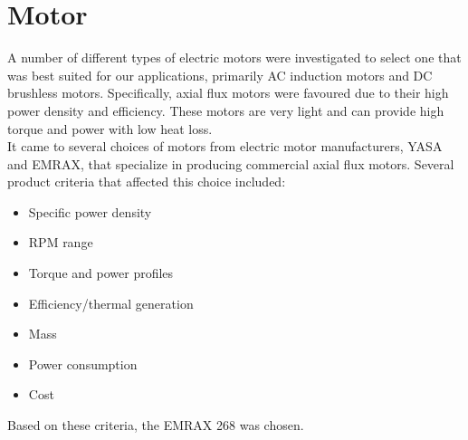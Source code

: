 \documentclass[main.tex]{subfiles}
\begin{document}
    \section{Motor}
    A number of different types of electric motors were investigated to select one that was best suited for our applications, primarily AC induction motors and DC brushless motors. Specifically, axial flux motors were favoured due to their high power density and efficiency. These motors are very light and can provide high torque and power with low heat loss.\\

    It came to several choices of motors from electric motor manufacturers, YASA and EMRAX, that specialize in producing commercial axial flux motors. Several product criteria that affected this choice included:
    \begin{itemize}
        \item Specific power density
        \item RPM range
        \item Torque and power profiles
        \item Efficiency/thermal generation
        \item Mass
        \item Power consumption
        \item Cost
    \end{itemize}

    Based on these criteria, the EMRAX 268 was chosen.\\
\end{document}
